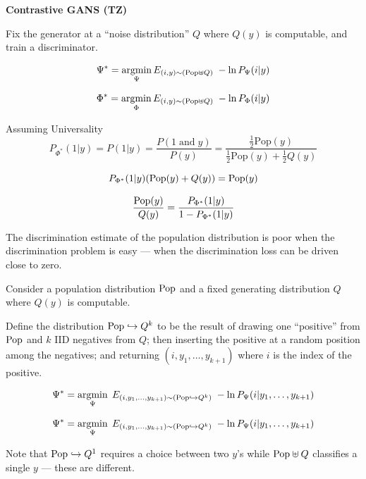 {\slide{}
\vfill
\centerline{\bf Contrastive GANS (TZ)}
\vfill\vfill


Fix the generator at a ``noise distribution'' $Q$ where $Q(y)$ is computable, and train a discriminator.

\vfill
{\color{red} $$\Psi^* = \operatorname*{argmin}_\Psi E_{(i,y) \sim (\mathrm{Pop} \uplus Q)}\;-\ln P_\Psi(i|y)$$}


{\color{red} $$\Phi^* = \operatorname*{argmin}_\Phi E_{(i,y) \sim (\mathrm{Pop} \uplus Q)}\;-\ln P_\Phi(i|y)$$}

Assuming Universality
$$P_{\Phi^*}(1|y) = P(1|y) = \frac{P(1\;\mathrm{and}\; y)}{P(y)} = \frac{\frac{1}{2}\mathrm{Pop}(y)}{\frac{1}{2}\mathrm{Pop}(y) + \frac{1}{2}Q(y)}$$

\vfill
$$P_{\Phi^*}(1|y)(\mathrm{Pop}(y) + Q(y)) = \mathrm{Pop}(y)$$

\vfill
{\color{red} $$ \frac{\mathrm{Pop}(y)}{Q(y)} = \frac{P_{\Phi^*}(1|y)}{1-P_{\Phi^*}(1|y)}$$}


The discrimination estimate of the population distribution is poor when the discrimination problem is easy --- when the discrimination loss can be driven close to zero.


Consider a population distribution $\mathrm{Pop}$ and a fixed generating distribution $Q$ where $Q(y)$ is computable.

\vfill
Define the distribution {\color{red} $\mathrm{Pop}\hookrightarrow Q^k$} to be the result of drawing one ``positive'' from $\mathrm{Pop}$ and $k$ IID negatives from $Q$;
then inserting the positive at a random position among the negatives; and returning $(i,y_1,\ldots,y_{k+1})$ where
$i$ is the index of the positive.

{\color{red} $$\Psi^* = \operatorname*{argmin}_\Psi\; E_{(i,y_1,\ldots,y_{k+1})\sim (\mathrm{Pop}\hookrightarrow Q^k)} \;- \ln P_\Psi(i|y_1,\ldots,y_{k+1})$$}


{\color{red} $$\Psi^* = \operatorname*{argmin}_\Psi\; E_{(i,y_1,\ldots,y_{k+1})\sim (\mathrm{Pop}\hookrightarrow Q^k)} \;- \ln P_\Psi(i|y_1,\ldots,y_{k+1})$$}

\vfill
Note that $\mathrm{Pop}\hookrightarrow Q^1$ requires a choice between two $y$'s while $\mathrm{Pop}\uplus Q$ classifies a single $y$ --- these are different.

}
